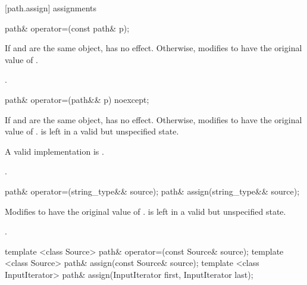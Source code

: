[path.assign]{ assignments}

%
\begin{itemdecl}
path& operator=(const path& p);
\end{itemdecl}

\begin{itemdescr}
\pnum
\effects If  and  are the same
object, has no effect. Otherwise, modifies  to have the
original value of .

\pnum
\returns {}.
\end{itemdescr}

%
\begin{itemdecl}
path& operator=(path&& p) noexcept;
\end{itemdecl}

\begin{itemdescr}
\pnum
\effects If  and  are the same
object, has no effect. Otherwise, modifies  to have the
original value of .  is left in a
valid but unspecified state.
\begin{note} A valid implementation is . \end{note}

\pnum
\returns {}.
\end{itemdescr}

%
%
\begin{itemdecl}
path& operator=(string_type&& source);
path& assign(string_type&& source);
\end{itemdecl}

\begin{itemdescr}
\pnum
\effects Modifies  to have the original value of .
 is left in a valid but unspecified state.

\pnum
\returns {}.
\end{itemdescr}

%
%
\begin{itemdecl}
template <class Source>
  path& operator=(const Source& source);
template <class Source>
  path& assign(const Source& source);
template <class InputIterator>
  path& assign(InputIterator first, InputIterator last);
\end{itemdecl}


